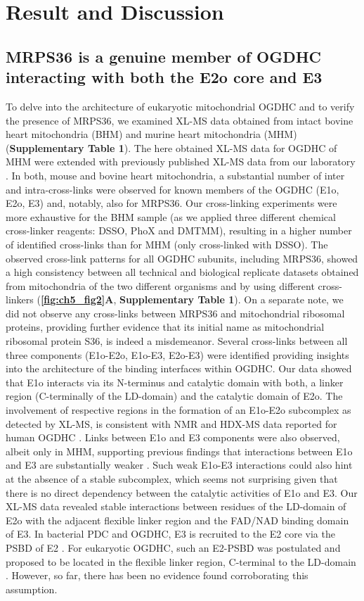 \section{Result and Discussion}
\subsection*{MRPS36 is a genuine member of OGDHC interacting with both the E2o core and E3}
To delve into the architecture of eukaryotic mitochondrial OGDHC and to verify the presence of MRPS36, we examined XL-MS data obtained from intact bovine heart mitochondria (BHM) \cite{Hevler_2021b} and murine heart mitochondria (MHM) (\textbf{Supplementary Table 1}). The here obtained XL-MS data for OGDHC of MHM were extended with previously published XL-MS data from our laboratory \cite{Liu_2018}. In both, mouse and bovine heart mitochondria, a substantial number of inter and intra-cross-links were observed for known members of the OGDHC (E1o, E2o, E3) and, notably, also for MRPS36. Our cross-linking experiments were more exhaustive for the BHM sample (as we applied three different chemical cross-linker reagents: DSSO, PhoX and DMTMM), resulting in a higher number of identified cross-links than for MHM (only cross-linked with DSSO). The observed cross-link patterns for all OGDHC subunits, including MRPS36, showed a high consistency between all technical and biological replicate datasets obtained from mitochondria of the two different organisms and by using different cross-linkers (\textbf{\autoref{fig:ch5_fig2}A}, \textbf{Supplementary Table 1}). On a separate note, we did not observe any cross-links between MRPS36 and mitochondrial ribosomal proteins, providing further evidence that its initial name as mitochondrial ribosomal protein S36, is indeed a misdemeanor. Several cross-links between all three components (E1o-E2o, E1o-E3, E2o-E3) were identified providing insights into the architecture of the binding interfaces within OGDHC. Our data showed that E1o interacts via its N-terminus and catalytic domain with both, a linker region (C-terminally of the LD-domain) and the catalytic domain of E2o. The involvement of respective regions in the formation of an E1o-E2o subcomplex as detected by XL-MS, is consistent with NMR and HDX-MS data reported for human OGDHC \cite{Zhou_2018}. Links between E1o and E3 components were also observed, albeit only in MHM, supporting previous findings that interactions between E1o and E3 are substantially weaker \cite{Zhou_2018}. Such weak E1o-E3 interactions could also hint at the absence of a stable subcomplex, which seems not surprising given that there is no direct dependency between the catalytic activities of E1o and E3. Our XL-MS data revealed stable interactions between residues of the LD-domain of E2o with the adjacent flexible linker region and the FAD/NAD binding domain of E3. In bacterial PDC and OGDHC, E3 is recruited to the E2 core via the PSBD of E2 \cite{Frank_2005, Fries_2007, Mande_1996, Perham_2000, Robien_1992}. For eukaryotic OGDHC, such an E2-PSBD was postulated and proposed to be located in the flexible linker region, C-terminal to the LD-domain \cite{Liu_2022}. However, so far, there has been no evidence found corroborating this assumption.


